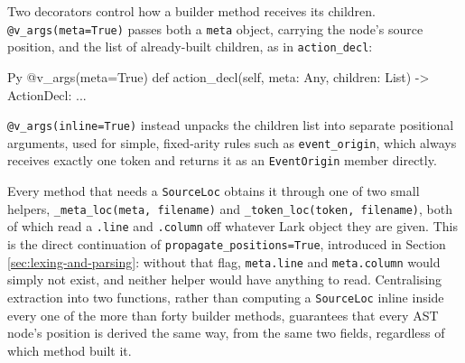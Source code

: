 Two decorators control how a builder method receives its children. \lstinline|@v_args(meta=True)| passes both a \lstinline|meta| object, carrying the node's source position, and the list of already-built children, as in \lstinline|action_decl|:

\begin{codeblock}[]{Py}
@v_args(meta=True)
def action_decl(self, meta: Any, children: List) -> ActionDecl:
    ...
\end{codeblock}

\lstinline|@v_args(inline=True)| instead unpacks the children list into separate positional arguments, used for simple, fixed-arity rules such as \lstinline|event_origin|, which always receives exactly one token and returns it as an \lstinline|EventOrigin| member directly.

Every method that needs a \lstinline|SourceLoc| obtains it through one of two small helpers, \lstinline|_meta_loc(meta, filename)| and \lstinline|_token_loc(token, filename)|, both of which read a \lstinline|.line| and \lstinline|.column| off whatever Lark object they are given. This is the direct continuation of \lstinline|propagate_positions=True|, introduced in Section \ref{sec:lexing-and-parsing}: without that flag, \lstinline|meta.line| and \lstinline|meta.column| would simply not exist, and neither helper would have anything to read. Centralising extraction into two functions, rather than computing a \lstinline|SourceLoc| inline inside every one of the more than forty builder methods, guarantees that every AST node's position is derived the same way, from the same two fields, regardless of which method built it.

